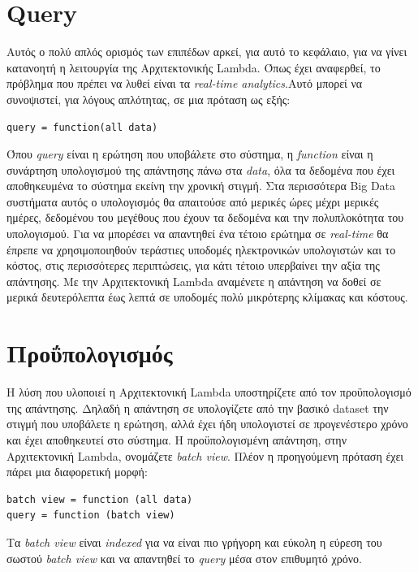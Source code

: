 \section{Query}
Αυτός ο πολύ απλός ορισμός των επιπέδων αρκεί, για αυτό το κεφάλαιο, για να γίνει κατανοητή η λειτουργία της Αρχιτεκτονικής Lambda. Όπως έχει αναφερθεί, το πρόβλημα που πρέπει να λυθεί είναι τα \textit{real-time analytics}.Αυτό μπορεί να συνοψιστεί, για λόγους απλότητας, σε μια πρόταση ως εξής:
\begin{verbatim}
query = function(all data)
\end{verbatim}

Όπου \textit{query} είναι η ερώτηση που υποβάλετε στο σύστημα, η \textit{function} είναι η συνάρτηση υπολογισμού της απάντησης πάνω στα \textit{data}, όλα τα δεδομένα που έχει αποθηκευμένα το σύστημα εκείνη την χρονική στιγμή.
\newline
Στα περισσότερα Big Data συστήματα αυτός ο υπολογισμός θα απαιτούσε από μερικές ώρες μέχρι μερικές ημέρες, δεδομένου του μεγέθους που έχουν τα δεδομένα και την πολυπλοκότητα του υπολογισμού. Για να μπορέσει να απαντηθεί ένα τέτοιο ερώτημα σε \textit{real-time} θα έπρεπε να χρησιμοποιηθούν τεράστιες υποδομές ηλεκτρονικών υπολογιστών και το κόστος, στις περισσότερες περιπτώσεις, για κάτι τέτοιο υπερβαίνει την αξία της απάντησης. Με την Αρχιτεκτονική Lambda αναμένετε η απάντηση να δοθεί σε μερικά δευτερόλεπτα έως λεπτά σε υποδομές πολύ μικρότερης κλίμακας και κόστους. 

\section{Προΰπολογισμός}
Η λύση που υλοποιεί η Αρχιτεκτονική Lambda υποστηρίζετε από τον προϋπολογισμό της απάντησης. Δηλαδή η απάντηση σε υπολογίζετε από την βασικό dataset την στιγμή που υποβάλετε η ερώτηση, αλλά έχει ήδη υπολογιστεί σε προγενέστερο χρόνο και έχει αποθηκευτεί στο σύστημα. Η προϋπολογισμένη απάντηση, στην Αρχιτεκτονική Lambda, ονομάζετε \textit{batch view}. Πλέον η προηγούμενη πρόταση έχει πάρει μια διαφορετική μορφή:
\begin{verbatim}
batch view = function (all data)
query = function (batch view)
\end{verbatim}
Τα \textit{batch view} είναι \textit{indexed} για να είναι πιο γρήγορη και εύκολη η εύρεση του σωστού \textit{batch view} και να απαντηθεί το \textit{query} μέσα στον επιθυμητό χρόνο.




